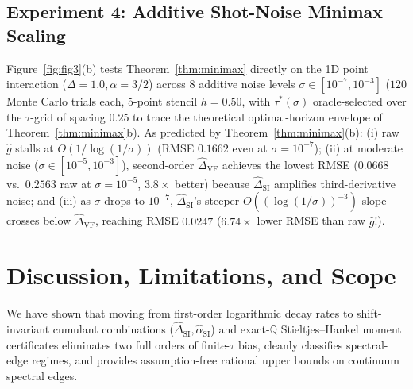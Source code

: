 \documentclass[11pt,a4paper]{article}
\theoremstyle{definition}
\newcommand{\Q}{\mathbb{Q}}
\begin{document}
\subsection{Experiment 4: Additive Shot-Noise Minimax Scaling}

Figure~\ref{fig:fig3}(b) tests Theorem~\ref{thm:minimax} directly on the 1D point interaction ($\Delta=1.0, \alpha=3/2$) across 8 additive noise levels $\sigma \in [10^{-7}, 10^{-3}]$ ($120$ Monte Carlo trials each, 5-point stencil $h = 0.50$, with $\tau^*(\sigma)$ oracle-selected over the $\tau$-grid of spacing $0.25$ to trace the theoretical optimal-horizon envelope of Theorem~\ref{thm:minimax}b). As predicted by Theorem~\ref{thm:minimax}(b): (i) raw $\widehat{g}$ stalls at $O(1/\log(1/\sigma))$ (RMSE $0.1662$ even at $\sigma = 10^{-7}$); (ii) at moderate noise ($\sigma \in [10^{-5}, 10^{-3}]$), second-order $\widehat{\Delta}_{\mathrm{VF}}$ achieves the lowest RMSE ($0.0668$ vs.\ $0.2563$ raw at $\sigma = 10^{-5}$, $3.8\times$ better) because $\widehat{\Delta}_{\mathrm{SI}}$ amplifies third-derivative noise; and (iii) as $\sigma$ drops to $10^{-7}$, $\widehat{\Delta}_{\mathrm{SI}}$'s steeper $O((\log(1/\sigma))^{-3})$ slope crosses below $\widehat{\Delta}_{\mathrm{VF}}$, reaching RMSE $\mathbf{0.0247}$ ($\mathbf{6.74\times}$ lower RMSE than raw $\widehat{g}$!).

\section{Discussion, Limitations, and Scope}
\label{sec:discussion}

We have shown that moving from first-order logarithmic decay rates to shift-invariant cumulant combinations ($\widehat{\Delta}_{\mathrm{SI}}, \widehat{\alpha}_{\mathrm{SI}}$) and exact-$\Q$ Stieltjes--Hankel moment certificates eliminates two full orders of finite-$\tau$ bias, cleanly classifies spectral-edge regimes, and provides assumption-free rational upper bounds on continuum spectral edges.
\end{document}
